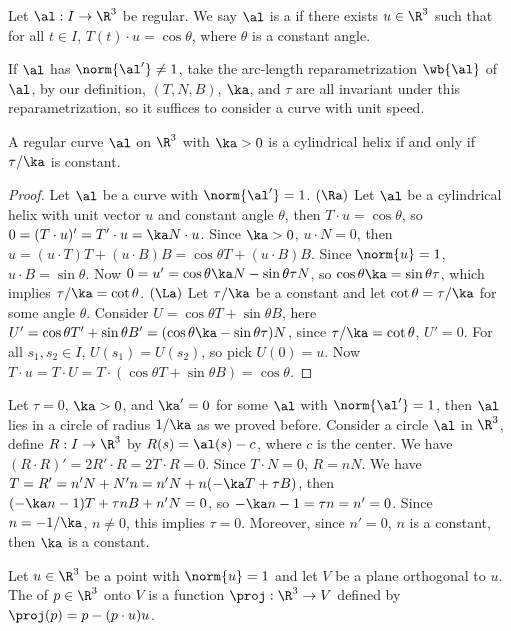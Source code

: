 \documentclass[10pt]{article}
\begin{document}
\begin{definition}
    Let $\al:I\to{\R}^{3}$ be regular. We say $\al$ is a  if there exists $u\in{\R}^{3}$ such that for all $t\in I$, $T(t)\cdot u=\cos\theta$, where $\theta$ is a constant angle.
\end{definition}
\par
If $\al$ has $\norm{\al'}\ne 1$, take the arc-length reparametrization $\wb{\al}$ of $\al$, by our definition, $(T,N,B)$, $\ka$, and $\tau$ are all invariant under this reparametrization, so it suffices to consider a curve with unit speed.
\begin{proposition}
    A regular curve $\al$ on ${\R}^{3}$ with $\ka>0$ is a cylindrical helix if and only if $\tau/\ka$ is constant.
\end{proposition}
\begin{proof}
    Let $\al$ be a curve with $\norm{\al'}=1$. $(\Ra)$ Let $\al$ be a cylindrical helix with unit vector $u$ and constant angle $\theta$, then $T\cdot u=\cos\theta$, so $0=(T\cdot u)'=T'\cdot u=\ka N\cdot u$. Since $\ka>0$, $u\cdot N=0$, then $u=(u\cdot T)T+(u\cdot B)B=\cos\theta T+(u\cdot B)B$. Since $\norm{u}=1$, $u\cdot B=\sin\theta$. Now $0=u'=\cos\theta\ka N-\sin\theta\tau N$, so $\cos\theta\ka=\sin\theta\tau$, which implies $\tau/\ka=\cot\theta$. $(\La)$ Let $\tau/\ka$ be a constant and let $\cot\theta=\tau/\ka$ for some angle $\theta$. Consider $U=\cos\theta T+\sin\theta B$, here $U'=\cos\theta T'+\sin\theta B'=(\cos\theta\ka-\sin\theta\tau)N$, since $\tau/\ka=\cot\theta$, $U'=0$. For all ${s}_{1},{s}_{2}\in I$, $U({s}_{1})=U({s}_{2})$, so pick $U(0)=u$. Now $T\cdot u=T\cdot U=T\cdot(\cos\theta T+\sin\theta B)=\cos\theta$.
\end{proof}
\par
Let $\tau=0$, $\ka>0$, and $\ka'=0$ for some $\al$ with $\norm{\al'}=1$, then $\al$ lies in a circle of radius $1/\ka$ as we proved before. Consider a circle $\al$ in ${\R}^{3}$, define $R:I\to{\R}^{3}$ by $R(s)=\al(s)-c$, where $c$ is the center. We have $(R\cdot R)'=2R'\cdot R=2T\cdot R=0$. Since $T\cdot N=0$, $R=nN$. We have $T=R'=n'N+N'n=n'N+n(-\ka T+\tau B)$, then $(-\ka n-1)T+\tau nB+n'N=0$, so $-\ka n-1=\tau n=n'=0$. Since $n=-1/\ka$, $n\ne 0$, this implies $\tau=0$. Moreover, since $n'=0$, $n$ is a constant, then $\ka$ is a constant.
\begin{definition}
    Let $u\in{\R}^{3}$ be a point with $\norm{u}=1$ and let $V$ be a plane orthogonal to $u$. The  of $p\in{\R}^{3}$ onto $V$ is a function $\proj:{\R}^{3}\to V$ defined by $\proj(p)=p-(p\cdot u)u$.
\end{definition}
\end{document}
